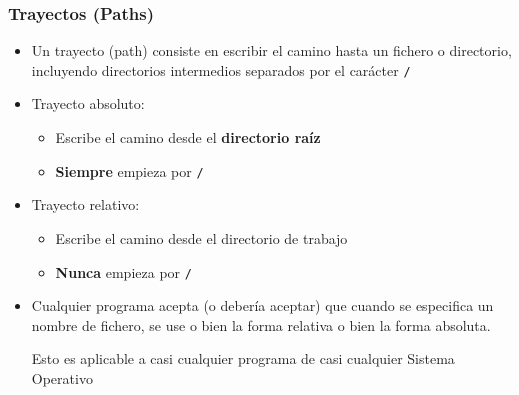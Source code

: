 \documentclass[ucs]{beamer}
\begin{document}
\begin{frame}[fragile]
  \frametitle{Trayectos (Paths)}

  \begin{itemize}
  \item Un trayecto (path) consiste en escribir el camino hasta un
    fichero o directorio, incluyendo directorios intermedios separados
    por el carácter \verb|/|
  \item Trayecto absoluto: 
    \begin{footnotesize}
      \begin{itemize}
      \item Escribe el camino desde el \textbf{directorio raíz}
      \item \textbf{Siempre} empieza por \verb|/|
      \end{itemize} 
    \end{footnotesize}
  \item Trayecto relativo: 
    \begin{footnotesize}
      \begin{itemize}
      \item Escribe el camino desde el directorio de trabajo
      \item \textbf{Nunca} empieza por \verb|/|
      \end{itemize} 
    \end{footnotesize}


\item
Cualquier programa acepta (o debería aceptar) que cuando
se especifica un nombre de fichero, se use o bien la forma
relativa o bien la forma absoluta. 

Esto es aplicable a casi cualquier programa de casi
cualquier Sistema Operativo

  \end{itemize}

\end{frame}
\end{document}
